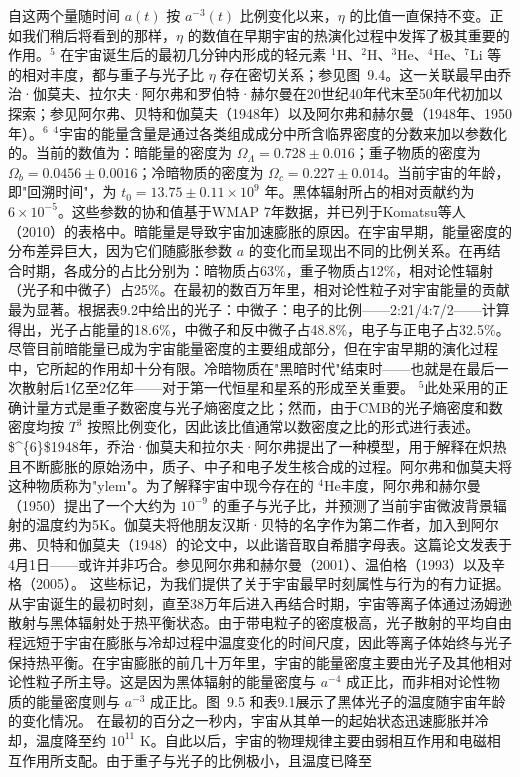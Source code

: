 自这两个量随时间 \(a(t)\) 按 \(a^{-3}(t)\) 比例变化以来，\(\eta\) 的比值一直保持不变。正如我们稍后将看到的那样，\(\eta\) 的数值在早期宇宙的热演化过程中发挥了极其重要的作用。\(^{5}\)
在宇宙诞生后的最初几分钟内形成的轻元素 \(^{1}\)H、\(^{2}\)H、\(^{3}\)He、\(^{4}\)He、\(^{7}\)Li 等的相对丰度，都与重子与光子比 \(\eta\) 存在密切关系；参见图~9.4。这一关联最早由乔治·伽莫夫、拉尔夫·阿尔弗和罗伯特·赫尔曼在20世纪40年代末至50年代初加以探索；参见阿尔弗、贝特和伽莫夫（1948年）以及阿尔弗和赫尔曼（1948年、1950年）。\(^{6}\)
\(^{4}\)宇宙的能量含量是通过各类组成成分中所含临界密度的分数来加以参数化的。当前的数值为：暗能量的密度为 \(\Omega_{\Lambda}=0.728\pm0.016\)；重子物质的密度为 \(\Omega_{b}=0.0456\pm0.0016\)；冷暗物质的密度为 \(\Omega_{c}=0.227\pm0.014\)。当前宇宙的年龄，即"回溯时间"，为 \(t_{0}=13.75\pm0.11\times10^{9}\) 年。黑体辐射所占的相对贡献约为 \(6\times10^{-5}\)。这些参数的协和值基于WMAP 7年数据，并已列于Komatsu等人（2010）的表格中。暗能量是导致宇宙加速膨胀的原因。在宇宙早期，能量密度的分布差异巨大，因为它们随膨胀参数 \(a\) 的变化而呈现出不同的比例关系。在再结合时期，各成分的占比分别为：暗物质占63\%，重子物质占12\%，相对论性辐射（光子和中微子）占25\%。在最初的数百万年里，相对论性粒子对宇宙能量的贡献最为显著。根据表9.2中给出的光子：中微子：电子的比例——2:21/4:7/2——计算得出，光子占能量的18.6\%，中微子和反中微子占48.8\%，电子与正电子占32.5\%。尽管目前暗能量已成为宇宙能量密度的主要组成部分，但在宇宙早期的演化过程中，它所起的作用却十分有限。冷暗物质在"黑暗时代"结束时——也就是在最后一次散射后1亿至2亿年——对于第一代恒星和星系的形成至关重要。
\(^{5}\)此处采用的正确计量方式是重子数密度与光子熵密度之比；然而，由于CMB的光子熵密度和数密度均按 \(T^{3}\) 按照比例变化，因此该比值通常以数密度之比的形式进行表述。
\$\^{}\{6\}\$1948年，乔治·伽莫夫和拉尔夫·阿尔弗提出了一种模型，用于解释在炽热且不断膨胀的原始汤中，质子、中子和电子发生核合成的过程。阿尔弗和伽莫夫将这种物质称为"ylem"。为了解释宇宙中现今存在的 \(^{4}\)He丰度，阿尔弗和赫尔曼（1950）提出了一个大约为 \(10^{-9}\) 的重子与光子比，并预测了当前宇宙微波背景辐射的温度约为5K。伽莫夫将他朋友汉斯·贝特的名字作为第二作者，加入到阿尔弗、贝特和伽莫夫（1948）的论文中，以此谐音取自希腊字母表。这篇论文发表于4月1日——或许并非巧合。参见阿尔弗和赫尔曼（2001）、温伯格（1993）以及辛格（2005）。
这些标记，为我们提供了关于宇宙最早时刻属性与行为的有力证据。
从宇宙诞生的最初时刻，直至38万年后进入再结合时期，宇宙等离子体通过汤姆逊散射与黑体辐射处于热平衡状态。由于带电粒子的密度极高，光子散射的平均自由程远短于宇宙在膨胀与冷却过程中温度变化的时间尺度，因此等离子体始终与光子保持热平衡。在宇宙膨胀的前几十万年里，宇宙的能量密度主要由光子及其他相对论性粒子所主导。这是因为黑体辐射的能量密度与 \(a^{-4}\) 成正比，而非相对论性物质的能量密度则与 \(a^{-3}\) 成正比。图~9.5 和表9.1展示了黑体光子的温度随宇宙年龄的变化情况。
在最初的百分之一秒内，宇宙从其单一的起始状态迅速膨胀并冷却，温度降至约 \(10^{11}\) K。自此以后，宇宙的物理规律主要由弱相互作用和电磁相互作用所支配。由于重子与光子的比例极小，且温度已降至
